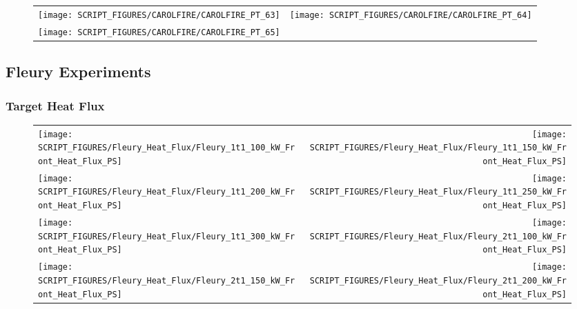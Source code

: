 \begin{figure}[p]
\begin{tabular*}{\textwidth}{l@{\extracolsep{\fill}}r}
\texttt{[image: SCRIPT\_FIGURES/CAROLFIRE/CAROLFIRE\_PT\_63]} &
\texttt{[image: SCRIPT\_FIGURES/CAROLFIRE/CAROLFIRE\_PT\_64]} \\
\texttt{[image: SCRIPT\_FIGURES/CAROLFIRE/CAROLFIRE\_PT\_65]}
\end{tabular*}
\end{figure}

\clearpage

\subsection{Fleury Experiments}

\subsubsection{Target Heat Flux}

\begin{figure}[p]
\begin{tabular*}{\textwidth}{l@{\extracolsep{\fill}}r}
\texttt{[image: SCRIPT\_FIGURES/Fleury\_Heat\_Flux/Fleury\_1t1\_100\_kW\_Front\_Heat\_Flux\_PS]} &
\texttt{[image: SCRIPT\_FIGURES/Fleury\_Heat\_Flux/Fleury\_1t1\_150\_kW\_Front\_Heat\_Flux\_PS]} \\
\texttt{[image: SCRIPT\_FIGURES/Fleury\_Heat\_Flux/Fleury\_1t1\_200\_kW\_Front\_Heat\_Flux\_PS]} &
\texttt{[image: SCRIPT\_FIGURES/Fleury\_Heat\_Flux/Fleury\_1t1\_250\_kW\_Front\_Heat\_Flux\_PS]} \\
\texttt{[image: SCRIPT\_FIGURES/Fleury\_Heat\_Flux/Fleury\_1t1\_300\_kW\_Front\_Heat\_Flux\_PS]} &
\texttt{[image: SCRIPT\_FIGURES/Fleury\_Heat\_Flux/Fleury\_2t1\_100\_kW\_Front\_Heat\_Flux\_PS]} \\
\texttt{[image: SCRIPT\_FIGURES/Fleury\_Heat\_Flux/Fleury\_2t1\_150\_kW\_Front\_Heat\_Flux\_PS]} &
\texttt{[image: SCRIPT\_FIGURES/Fleury\_Heat\_Flux/Fleury\_2t1\_200\_kW\_Front\_Heat\_Flux\_PS]}
\end{tabular*}
\end{figure}

